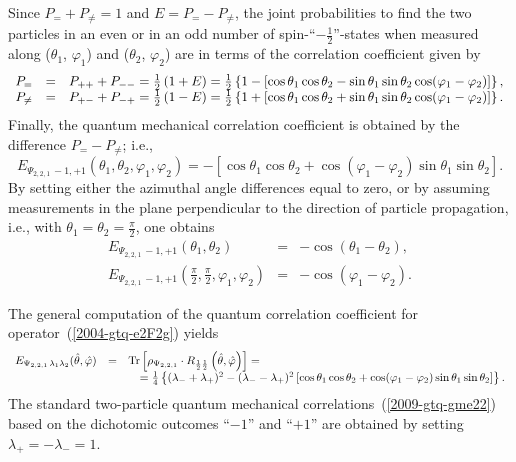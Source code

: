 \documentclass[fleqn,twoside]{article}      %
\begin{document}
Since $P_= + P_{\neq} = 1$ and $E= P_= - P_{\neq}$, the joint probabilities to find the two particles
in an even or in an odd number of
spin-``$-\frac{1}{2}$''-states when measured along
($\theta_1$, $\varphi_1 $) and
($\theta_2$, $\varphi_2 $)
are in terms of the correlation coefficient given by
\begin{equation}
\begin{array}{rcl}
P_= &=& P_{++}+P_{--} =
{1\over2}\left(1 + E  \right)
=\frac{1}{2} \left\{ 1- \left[\cos \theta_1 \cos \theta_2 - \sin \theta_1 \sin \theta_2 \cos (\varphi_1-\varphi_2) \right]\right\}
,
\\
P_{\neq} &=& P_{+-}+P_{-+} =
{1\over2}\left(1 - E \right)
=\frac{1}{2} \left\{ 1+ \left[\cos \theta_1 \cos \theta_2 + \sin \theta_1 \sin \theta_2 \cos (\varphi_1-\varphi_2) \right]\right\}
.
\end{array}
\end{equation}
Finally, the quantum mechanical correlation coefficient is obtained by  the difference $P_= -P_{\neq }$; i.e.,
\begin{equation}
E_{{ \Psi_{2,2,1}}\,-1,+1  }(\theta_1,\theta_2,\varphi_1 , \varphi_2)=
-\left[\cos \theta_1 \cos \theta_2 + \cos (\varphi_1 - \varphi_2) \sin \theta_1 \sin \theta_2\right]
.
\label{2009-gtq-gme22}
\end{equation}
By setting either the azimuthal angle differences equal to zero,
or by assuming measurements in the plane perpendicular to the direction of particle propagation,
i.e., with $\theta_1=\theta_2 =\frac{\pi}{2}$,
one obtains
\begin{equation}
\label{2009-gtq-edosgc}
\begin{array}{rcl}
E_{{ \Psi_{2,2,1}}\,-1,+1  }(\theta_1,\theta_2)&=& -\cos (\theta_1 - \theta_2),\\
E_{{ \Psi_{2,2,1}}\,-1,+1  }(\frac{\pi}{2},\frac{\pi}{2},\varphi_1 , \varphi_2) &=& - \cos (\varphi_1 - \varphi_2).
\end{array}
\end{equation}


The general computation of the quantum correlation coefficient for operator~(\ref{2004-gtq-e2F2g})
yields
\begin{equation}
\begin{array}{rcl}
E_{{ \Psi_{2,2,1}}\,\lambda_1 \lambda_2 } ({\hat \theta},{\hat \varphi} )&=&
{\rm Tr}\left[\rho_{ \Psi_{2,2,1}} \cdot R_{\frac{1}{2}\frac{1}{2} } \left({\hat \theta},{\hat \varphi} \right)\right] =\\
&&\quad  =
\frac{1}{4} \left\{( \lambda_- + \lambda_+ )^2-( \lambda_- - \lambda_+ )^2 \left[\cos
    \theta_1  \cos  \theta_2 +\cos ( \varphi_1 - \varphi_2 ) \sin
    \theta_1  \sin  \theta_2 \right]\right\}.
\end{array}
\end{equation}
The standard two-particle quantum mechanical correlations~(\ref{2009-gtq-gme22}) based on the dichotomic outcomes
``$-1$''
and
``$+1$''
are obtained by setting
$  \lambda_+ = -  \lambda_- =1$.
\end{document}
